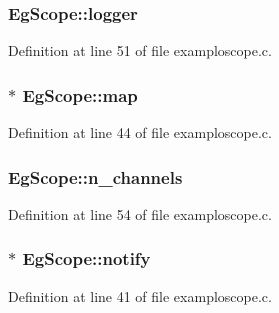 \subsubsection[{\texorpdfstring{logger}{logger}}]{ Eg\+Scope\+::logger}\hypertarget{struct_eg_scope_ae5c945f9302b5e46390b62361eba3f73}{}\label{struct_eg_scope_ae5c945f9302b5e46390b62361eba3f73}


Definition at line 51 of file examploscope.\+c.

\subsubsection[{\texorpdfstring{map}{map}}]{$\ast$ Eg\+Scope\+::map}\hypertarget{struct_eg_scope_aaeed3951c107c890a3f1da371918096d}{}\label{struct_eg_scope_aaeed3951c107c890a3f1da371918096d}


Definition at line 44 of file examploscope.\+c.

\subsubsection[{\texorpdfstring{n\+\_\+channels}{n_channels}}]{ Eg\+Scope\+::n\+\_\+channels}\hypertarget{struct_eg_scope_a88856e693c22a483c684cdec70f0b359}{}\label{struct_eg_scope_a88856e693c22a483c684cdec70f0b359}


Definition at line 54 of file examploscope.\+c.

\subsubsection[{\texorpdfstring{notify}{notify}}]{$\ast$ Eg\+Scope\+::notify}\hypertarget{struct_eg_scope_a8a055e1fb298f3284f9817e573ebe0dc}{}\label{struct_eg_scope_a8a055e1fb298f3284f9817e573ebe0dc}


Definition at line 41 of file examploscope.\+c.

